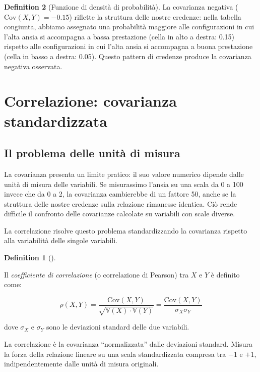 \documentclass[
  letterpaper,
  DIV=11,
  numbers=noendperiod,
  oneside]{scrreprt}
\theoremstyle{definition}
\theoremstyle{plain}
\theoremstyle{definition}
\newtheorem{definition}{Definition}[chapter]
\theoremstyle{remark}
\begin{document}
\begin{definition}[Funzione di densità di
probabilità]
La covarianza negativa (\(\text{Cov}(X,Y) = -0.15\)) riflette la
struttura delle nostre credenze: nella tabella congiunta, abbiamo
assegnato una probabilità maggiore alle configurazioni in cui l'alta
ansia si accompagna a bassa prestazione (cella in alto a destra: 0.15)
rispetto alle configurazioni in cui l'alta ansia si accompagna a buona
prestazione (cella in basso a destra: 0.05). Questo pattern di credenze
produce la covarianza negativa osservata.

\section{Correlazione: covarianza
standardizzata}\label{correlazione-covarianza-standardizzata}

\subsection{Il problema delle unità di
misura}\label{il-problema-delle-unituxe0-di-misura}

La covarianza presenta un limite pratico: il suo valore numerico dipende
dalle unità di misura delle variabili. Se misurassimo l'ansia su una
scala da 0 a 100 invece che da 0 a 2, la covarianza cambierebbe di un
fattore 50, anche se la struttura delle nostre credenze sulla relazione
rimanesse identica. Ciò rende difficile il confronto delle covarianze
calcolate su variabili con scale diverse.

La correlazione risolve questo problema standardizzando la covarianza
rispetto alla variabilità delle singole variabili.

\begin{definition}[]\protect\hypertarget{def-correlation}{}\label{def-correlation}

Il \emph{coefficiente di correlazione} (o correlazione di Pearson) tra
\(X\) e \(Y\) è definito come:

\[
\rho(X,Y) = \frac{\text{Cov}(X,Y)}{\sqrt{\mathbb{V}(X) \cdot \mathbb{V}(Y)}} = \frac{\text{Cov}(X,Y)}{\sigma_X \sigma_Y}
\]

dove \(\sigma_X\) e \(\sigma_Y\) sono le deviazioni standard delle due
variabili.

\end{definition}

La correlazione è la covarianza ``normalizzata'' dalle deviazioni
standard. Misura la forza della relazione lineare su una scala
standardizzata compresa tra \(-1\) e \(+1\), indipendentemente dalle
unità di misura originali.


\end{definition}
\end{document}
